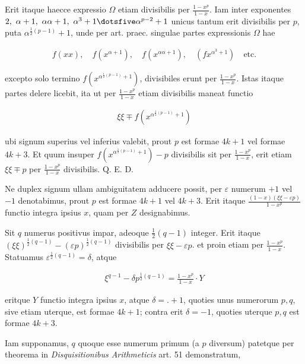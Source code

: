 Erit itaque haecce expressio $\Omega$ etiam divisibilis per $\frac{1-x^p}{1-x}$. Iam inter exponentes $2,\ \alpha+1,\ \alpha\alpha+1,\ \alpha^3+1\dotsfive\alpha^{p-2}+1$ unicus tantum erit divisibilis per $p$, puta $\alpha^{\frac12(p-1)}+1$, unde per art. praec. singulae partes expressionis $\Omega$ hae

\[
\begin{aligned}
f(xx),\quad f(x^{\alpha+1}),\quad f(x^{\alpha\alpha+1}),\quad (fx^{\alpha^3+1})\quad\text{etc.}
\end{aligned}
\]

excepto solo termino $f(x^{\alpha^{\frac12(p-1)}+1})$, divisibiles erunt per $\frac{1-x^p}{1-x}$. Istas itaque partes delere licebit, ita ut per $\frac{1-x^p}{1-x}$ etiam divisibilis maneat functio

\[
\begin{aligned}
\xi\xi\mp f(x^{\alpha^{\frac12(p-1)}+1})
\end{aligned}
\]

%
ubi signum superius vel inferius valebit, prout $p$ est formae $4k+1$ vel formae $4k+3$. Et quum insuper $f(x^{\alpha^{\frac12(p-1)}+1})-p$ divisibilis sit per $\frac{1-x^p}{1-x}$, erit etiam $\xi\xi\mp p$ per $\frac{1-x^p}{1-x}$ divisibilis. Q. E. D.

Ne duplex signum ullam ambiguitatem adducere possit, per $\varepsilon$ numerum $+1$ vel $-1$ denotabimus, prout $p$ est formae $4k+1$ vel $4k+3$. Erit itaque $\frac{(1-x)(\xi\xi-\varepsilon p)}{1-x^p}$ functio integra ipsius $x$, quam per $Z$ designabimus.


Sit $q$ numerus positivus impar, adeoque $\frac12(q-1)$ integer. Erit itaque $(\xi\xi)^{\frac12(q-1)}-(\varepsilon p)^{\frac12(q-1)}$ divisibilis per $\xi\xi-\varepsilon p$. et proin etiam per $\frac{1-x^p}{1-x}$. Statuamus $\varepsilon^{\frac12(q-1)}=\delta$, atque

\[
\begin{aligned}
\xi^{q-1}-\delta p^{\frac12(q-1)}=\frac{1-x^p}{1-x}\cdot Y
\end{aligned}
\]

eritque $Y$ functio integra ipsius $x$, atque $\delta=\mathord{.}+1$, quoties unus numerorum $p,q$, sive etiam uterque, est formae $4k+1$; contra erit $\delta=-1$, quoties uterque $p,q$ est formae $4k+3$.


Iam supponamus, $q$ quoque esse numerum primum (a $p$ diversum) patetque per theorema in \textit{Disquisitionibus Arithmeticis} art. 51 demonstratum,

